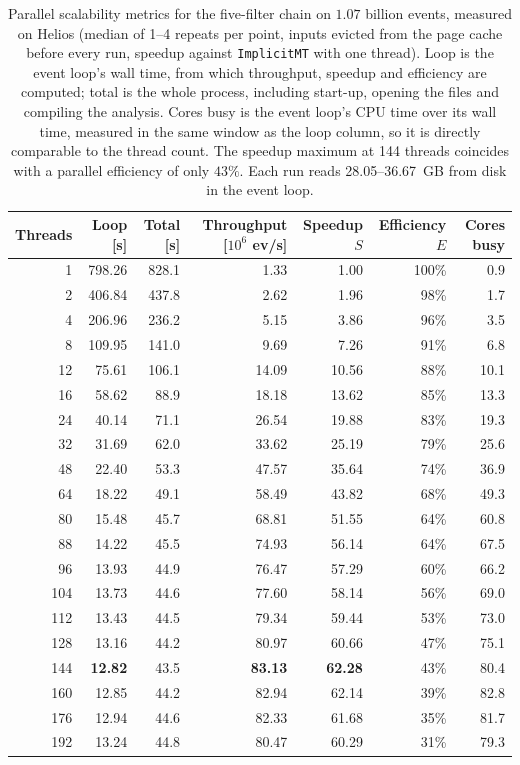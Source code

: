 \begin{table}[htbp]
\centering
\caption{Parallel scalability metrics for the five-filter chain on $1.07$ billion events, measured on Helios (median of 1--4 repeats per point, inputs evicted from the page cache before every run, speedup against \texttt{ImplicitMT} with one thread). Loop is the event loop's wall time, from which throughput, speedup and efficiency are computed; total is the whole process, including start-up, opening the files and compiling the analysis. Cores busy is the event loop's CPU time over its wall time, measured in the same window as the loop column, so it is directly comparable to the thread count. The speedup maximum at 144 threads coincides with a parallel efficiency of only $43\%$. Each run reads 28.05--36.67~GB from disk in the event loop.}
\label{tab:scalability-chain}
\setlength{\tabcolsep}{5pt}
\begin{tabular}{rrrrrrr}
\toprule
Threads & Loop [s] & Total [s] & Throughput [$10^6$ ev/s] & Speedup $S$ & Efficiency $E$ & Cores busy \\
\midrule
 1 & 798.26 & 828.1 & 1.33 & 1.00 & 100\% & 0.9 \\
 2 & 406.84 & 437.8 & 2.62 & 1.96 & 98\% & 1.7 \\
 4 & 206.96 & 236.2 & 5.15 & 3.86 & 96\% & 3.5 \\
 8 & 109.95 & 141.0 & 9.69 & 7.26 & 91\% & 6.8 \\
12 & 75.61 & 106.1 & 14.09 & 10.56 & 88\% & 10.1 \\
16 & 58.62 & 88.9 & 18.18 & 13.62 & 85\% & 13.3 \\
24 & 40.14 & 71.1 & 26.54 & 19.88 & 83\% & 19.3 \\
32 & 31.69 & 62.0 & 33.62 & 25.19 & 79\% & 25.6 \\
48 & 22.40 & 53.3 & 47.57 & 35.64 & 74\% & 36.9 \\
64 & 18.22 & 49.1 & 58.49 & 43.82 & 68\% & 49.3 \\
80 & 15.48 & 45.7 & 68.81 & 51.55 & 64\% & 60.8 \\
88 & 14.22 & 45.5 & 74.93 & 56.14 & 64\% & 67.5 \\
96 & 13.93 & 44.9 & 76.47 & 57.29 & 60\% & 66.2 \\
104 & 13.73 & 44.6 & 77.60 & 58.14 & 56\% & 69.0 \\
112 & 13.43 & 44.5 & 79.34 & 59.44 & 53\% & 73.0 \\
128 & 13.16 & 44.2 & 80.97 & 60.66 & 47\% & 75.1 \\
144 & \textbf{12.82} & 43.5 & \textbf{83.13} & \textbf{62.28} & 43\% & 80.4 \\
160 & 12.85 & 44.2 & 82.94 & 62.14 & 39\% & 82.8 \\
176 & 12.94 & 44.6 & 82.33 & 61.68 & 35\% & 81.7 \\
192 & 13.24 & 44.8 & 80.47 & 60.29 & 31\% & 79.3 \\
\bottomrule
\end{tabular}
\end{table}
